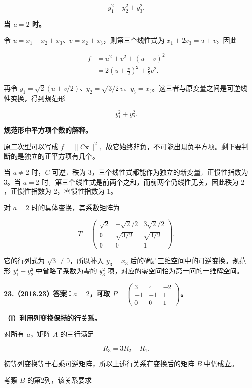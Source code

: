 \documentclass[UTF8,11pt,fontset=windows]{ctexart}
\begin{document}
$$
y_1^2+y_2^2+y_3^2.
$$

\textbf{当 $a=2$ 时。}

令 $u=x_1-x_2+x_3$、$v=x_2+x_3$，则第三个线性式为 $x_1+2x_3=u+v$。因此

$$
\begin{aligned}
f&=u^2+v^2+(u+v)^2\\
&=2\left(u+\frac v2\right)^2+\frac32v^2.
\end{aligned}
$$

再令 $y_1=\sqrt2(u+v/2)$、$y_2=\sqrt{3/2}\,v$、$y_3=x_3$。这三者与原变量之间是可逆线性变换，得到规范形

$$
y_1^2+y_2^2.
$$

\textbf{规范形中平方项个数的解释。}

原二次型可以写成 $f=\|C\boldsymbol x\|^2$，故它始终非负，不可能出现负平方项。剩下要判断的是独立的正平方项有几个。

当 $a\ne2$ 时，$C$ 可逆，秩为 $3$，三个线性式都能作为独立的新变量，正惯性指数为 $3$。当 $a=2$ 时，第三个线性式是前两个之和，而前两个仍线性无关，因此秩为 $2$，正惯性指数为 $2$，零惯性指数为 $1$。

对 $a=2$ 时的具体变换，其系数矩阵为

$$
T=\begin{pmatrix}
\sqrt2&-\sqrt2/2&3\sqrt2/2\\
0&\sqrt{3/2}&\sqrt{3/2}\\
0&0&1
\end{pmatrix}.
$$

它的行列式为 $\sqrt3\ne0$，所以补入 $y_3=x_3$ 后的确是三维空间中的可逆变换。规范形 $y_1^2+y_2^2$ 中省略了系数为零的 $y_3^2$ 项，对应的零空间恰为第一问的一维解空间。

\clearpage

\textbf{23.（2018.23）答案：$a=2$，可取 $P=\begin{pmatrix}3&4&-2\\-1&-1&1\\0&0&1\end{pmatrix}$。}

\textbf{（Ⅰ）利用列变换保持的行关系。}

对所有 $a$，矩阵 $A$ 的三行满足

$$
R_3=3R_2-R_1.
$$

初等列变换等于右乘可逆矩阵，所以上述行关系在变换后的矩阵 $B$ 中仍成立。

考察 $B$ 的第2列，该关系要求
\end{document}
